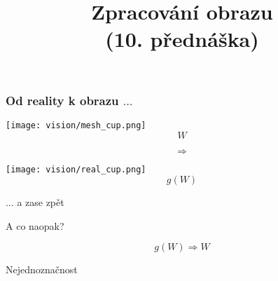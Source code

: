 \documentclass[red,handout,professionalfont]{beamer}
\title[]{Zpracování obrazu\\ (10. přednáška)}
\date[]{}
\theoremstyle{definition}
\newcommand{\0}{\mbox{${\bf 0}$}}
\begin{document}



\begin{frame}{} \titlepage
\end{frame}

\begin{frame}\frametitle{Od reality k obrazu $\ldots$}
\begin{center}
\begin{minipage}{4cm}
\texttt{[image: vision/mesh\_cup.png]}
\begin{displaymath}
 W
\end{displaymath}
\end{minipage}\pause
\begin{minipage}{1cm}
\begin{displaymath}
 \Rightarrow
\end{displaymath}
\end{minipage}\pause
\begin{minipage}{4cm}
\texttt{[image: vision/real\_cup.png]}
\begin{displaymath}
 g(W)
\end{displaymath}
\end{minipage}
\end{center}
\end{frame}

\begin{frame}{$\ldots$ a zase zpět}
\begin{center}
 A co naopak?
\end{center}\pause
\begin{displaymath}
 g(W)\Rightarrow W
\end{displaymath}\pause
\begin{center}
Nejednoznačnost
\end{center}\pause
\begin{center}
\end{center}\pause
\end{frame}
\end{document}
